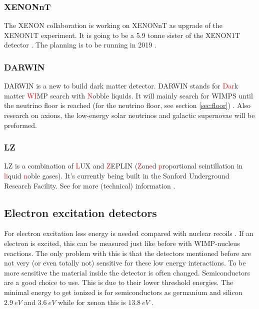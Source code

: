 \documentclass{article}
\begin{document}
\subsubsection{XENONnT}
The XENON collaboration is working on XENONnT as upgrade of the XENON1T experiment. It is going to be a 5.9 tonne sister of the XENON1T detector \cite{Aprile:2018dbl}. The planning is to be running in 2019 \cite{APPEC}.


\subsubsection{DARWIN}
DARWIN is a new to build dark matter detector. DARWIN stands for \textcolor{red}{Dar}k matter \textcolor{red}{WI}MP search with \textcolor{red}{N}obble liquids. It will mainly search for WIMPS until the neutrino floor is reached (for the neutrino floor, see section \ref{sec:floor}) \cite{Aalbers:2016jon}. Also research on axions, the low-energy solar neutrinos and galactic supernovae will be preformed.

\subsubsection{LZ}
LZ is a combination of \textcolor{red}{L}UX and \textcolor{red}{Z}EPLIN (\textcolor{red}{Z}on\textcolor{red}{e}d \textcolor{red}{p}roportional scintillation in \textcolor{red}{li}quid \textcolor{red}{n}oble gases). It's currently being built in the Sanford Underground Research Facility. See for more (technical) information \cite{Akerib:2015cja,Mount:2017qzi}.

\subsection{Electron excitation detectors}
For electron excitation less energy is needed compared with nuclear recoils \cite{Essig:2012yx}. If an electron is excited, this can be measured just like before with WIMP-nucleus reactions. The only problem with this is that the detectors mentioned before are not very (or even totally not) sensitive for these low energy interactions. To be more sensitive the material inside the detector is often changed. Semiconductors are a good choice to use. This is due to their lower threshold energies. The minimal energy to get ionized is for semiconductors as germanium and silicon $2.9\ eV$ and $3.6\ eV$ while for xenon this is $13.8\ eV$ \cite{Essig:2018tss}.%
\end{document}
